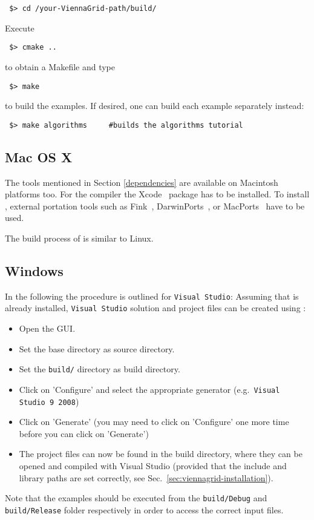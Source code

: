 \begin{lstlisting}
 $> cd /your-ViennaGrid-path/build/
\end{lstlisting}
Execute
\begin{lstlisting}
 $> cmake ..
\end{lstlisting}
to obtain a Makefile and type
\begin{lstlisting}
 $> make 
\end{lstlisting}
to build the examples. If desired, one can build each example separately instead:
\begin{lstlisting}
 $> make algorithms     #builds the algorithms tutorial
\end{lstlisting}


\subsection{Mac OS X}
\label{apple}
The tools mentioned in Section \ref{dependencies} are available on 
Macintosh platforms too. 
For the {\GCC} compiler the Xcode~\cite{xcode} package has to be installed.
To install {\CMake}, external portation tools such as
Fink~\cite{fink}, DarwinPorts~\cite{darwinports}, 
or MacPorts~\cite{macports} have to be used. 

The build process of {\ViennaGrid} is similar to Linux.

\subsection{Windows}
In the following the procedure is outlined for \texttt{Visual Studio}: Assuming
that {\CMake} is already installed, \texttt{Visual Studio} solution
and project files can be created using {\CMake}:
\begin{itemize}
\item Open the {\CMake} GUI.
\item Set the {\ViennaGrid} base directory as source directory.
\item Set the \texttt{build/} directory as build directory.
\item Click on 'Configure' and select the appropriate generator
(e.g.~\texttt{Visual Studio 9 2008})
\item Click on 'Generate' (you may need to click on 'Configure' one more time
before you can click on 'Generate')
\item The project files can now be found in the {\ViennaGrid} build directory,
where they can be opened and compiled with Visual Studio (provided that the
include and library paths are set correctly, see
Sec.~\ref{sec:viennagrid-installation}).
\end{itemize}

Note that the examples should be executed from the \texttt{build/Debug} and \texttt{build/Release} folder respectively in order to access the correct input files.
